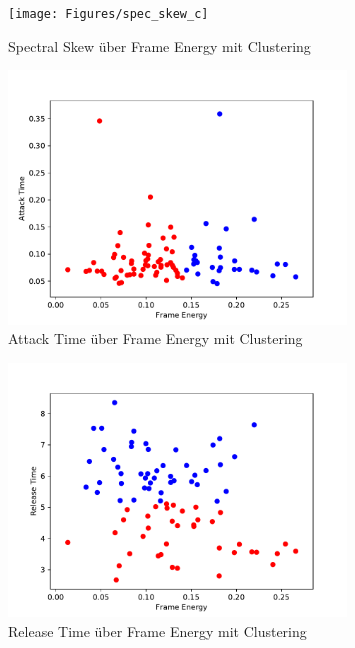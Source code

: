 \begin{figure}[H]
    \center
    \texttt{[image: Figures/spec\_skew\_c]}
    \caption{Spectral Skew über Frame Energy mit Clustering }
    \label{fig:spectral_skew_c}
\end{figure}

\begin{figure}[H]
    \center
    \includegraphics[width = 0.8\textwidth]{Figures/attack_time_c}
    \caption{Attack Time über Frame Energy mit Clustering }
    \label{fig:attack_time_c}
\end{figure}

\begin{figure}[H]
    \center
    \includegraphics[width = 0.8\textwidth]{Figures/release_time_c.pdf}
    \caption{Release Time über Frame Energy mit Clustering}
    \label{fig:release_time_c}
\end{figure}

\subsection{}

